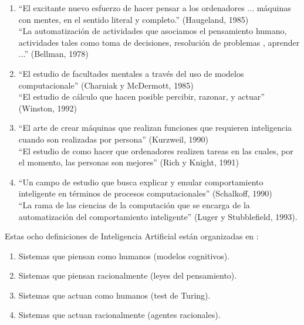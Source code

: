 \documentclass{article}
\begin{document}
\begin{enumerate}
\item \label{top_1}``El excitante nuevo esfuerzo de hacer pensar a los ordenadores ... máquinas con mentes, en el sentido literal y completo.'' (Haugeland, 1985) \\

``La automatización de actividades que asociamos el pensamiento humano, actividades tales como toma de decisiones, resolución de problemas , aprender ...'' (Bellman, 1978)

\item \label{top_2} ``El estudio de facultades mentales a través del uso de modelos computacionale'' (Charniak y McDermott, 1985) \\

``El estudio de cálculo que hacen posible percibir, razonar, y actuar'' (Winston, 1992)

\item \label{top_3}``El arte de crear máquinas que realizan funciones que requieren inteligencia cuando son realizadas por persona'' (Kurzweil, 1990)  \\

 ``El estudio de como hacer que ordenadores realizen tareas en las cuales, por el momento, las personas son mejores'' (Rich y Knight, 1991)

\item \label{top_4} ``Un campo de estudio que busca explicar y emular comportamiento inteligente en términos de procesos computacionales'' (Schalkoff, 1990) \\

``La rama de las ciencias de la computación que se encarga de la automatización del comportamiento inteligente'' (Luger y Stubblefield, 1993).
\end{enumerate}

Estas ocho definiciones de Inteligencia Artificial están organizadas en :

\begin{enumerate}
\item Sistemas que piensan como humanos (modelos cognitivos).

\item Sistemas que piensan racionalmente (leyes del pensamiento).

\item Sistemas que actuan como humanos (test de Turing).

\item Sistemas que actuan racionalmente (agentes racionales).
\end{enumerate}
\end{document}
